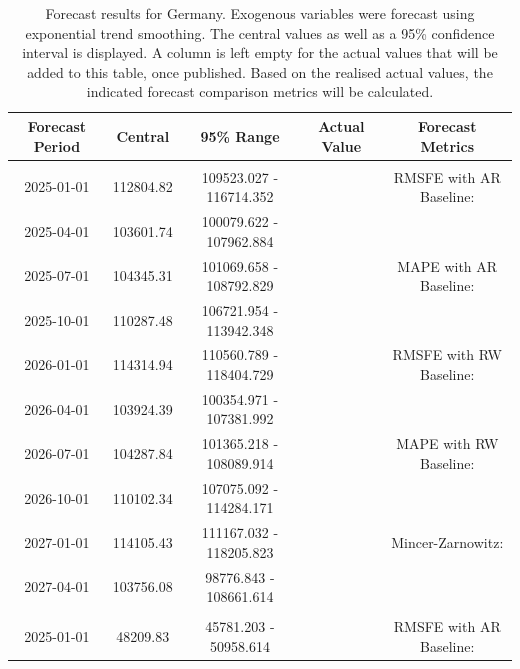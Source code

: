 \begin{table}
\centering
\caption{\label{tab:forecast_DE}Forecast results for Germany. Exogenous variables were forecast using exponential trend smoothing. The central values as well as a 95\% confidence interval is displayed. A column is left empty for the actual values that will be added to this table, once published. Based on the realised actual values, the indicated forecast comparison metrics will be calculated. }
\centering
\fontsize{7}{9}\selectfont
\begin{tabular}[t]{ccccc}
\toprule
Forecast Period & Central & 95\% Range & Actual Value & Forecast Metrics\\
\midrule
\addlinespace[0.3em]
\multicolumn{5}{l}{\textbf{ElectrCons}}\\
\hspace{1em}2025-01-01 & 112804.82 & 109523.027 - 116714.352 &  & RMSFE with AR Baseline:\\
\hspace{1em}2025-04-01 & 103601.74 & 100079.622 - 107962.884 &  & \\
\hspace{1em}2025-07-01 & 104345.31 & 101069.658 - 108792.829 &  & MAPE with AR Baseline:\\
\hspace{1em}2025-10-01 & 110287.48 & 106721.954 - 113942.348 &  & \\
\hspace{1em}2026-01-01 & 114314.94 & 110560.789 - 118404.729 &  & RMSFE with RW Baseline:\\
\hspace{1em}2026-04-01 & 103924.39 & 100354.971 - 107381.992 &  & \\
\hspace{1em}2026-07-01 & 104287.84 & 101365.218 - 108089.914 &  & MAPE with RW Baseline:\\
\hspace{1em}2026-10-01 & 110102.34 & 107075.092 - 114284.171 &  & \\
\hspace{1em}2027-01-01 & 114105.43 & 111167.032 - 118205.823 &  & Mincer-Zarnowitz:\\
\hspace{1em}2027-04-01 & 103756.08 & 98776.843 - 108661.614 &  & \\
\addlinespace[0.3em]
\multicolumn{5}{l}{\textbf{EmiCO2ElecHeat}}\\
\hspace{1em}2025-01-01 & 48209.83 & 45781.203 - 50958.614 &  & RMSFE with AR Baseline:\\

\end{tabular}
\end{table}

